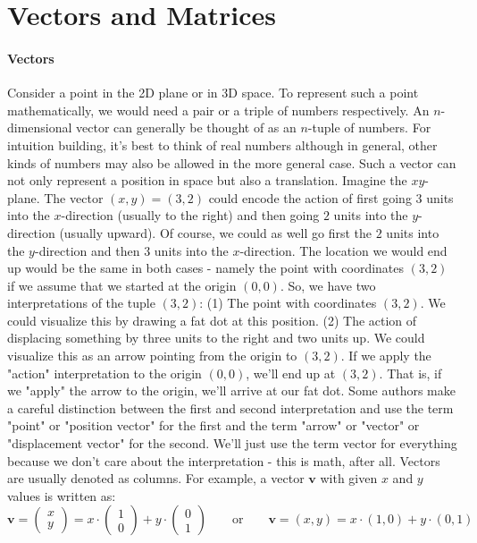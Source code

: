 \section{Vectors and Matrices}

\paragraph{Vectors}
Consider a point in the 2D plane or in 3D space. To represent such a point mathematically, we would need a pair or a triple of numbers respectively. An $n$-dimensional vector can generally be thought of as an $n$-tuple of numbers. For intuition building, it's best to think of real numbers although in general, other kinds of numbers may also be allowed in the more general case. Such a vector can not only represent a position in space but also a translation. Imagine the $xy$-plane. The vector $(x,y) = (3,2)$ could encode the action of first going $3$ units into the $x$-direction (usually to the right) and then going $2$ units into the $y$-direction (usually upward). Of course, we could as well go first the $2$ units into the $y$-direction and then $3$ units into the $x$-direction. The location we would end up would be the same in both cases - namely the point with coordinates $(3,2)$ if we assume that we started at the origin $(0,0)$. So, we have two interpretations of the tuple $(3,2)$: (1) The point with coordinates $(3,2)$. We could visualize this by drawing a fat dot at this position. (2) The action of displacing something by three units to the right and two units up. We could visualize this as an arrow pointing from the origin to $(3,2)$. If we apply the "action" interpretation to the origin $(0,0)$, we'll end up at $(3,2)$. That is, if we "apply" the arrow to the origin, we'll arrive at our fat dot. Some authors make a careful distinction between the first and second interpretation and use the term "point" or "position vector" for the first and the term "arrow" or "vector" or "displacement vector" for the second. We'll just use the term vector for everything because we don't care about the interpretation - this is math, after all. Vectors are usually denoted as columns. For example, a vector $\mathbf{v}$ with given $x$ and $y$ values is written as:
\begin{equation}
\mathbf{v} 
= \begin{pmatrix} x \\ y \end{pmatrix} 
=   x \cdot \begin{pmatrix} 1 \\ 0 \end{pmatrix} 
  + y \cdot \begin{pmatrix} 0 \\ 1 \end{pmatrix} 
\qquad \text{or}  \qquad
\mathbf{v} = (x,y) = x \cdot (1, 0) + y \cdot (0, 1)
\end{equation}
